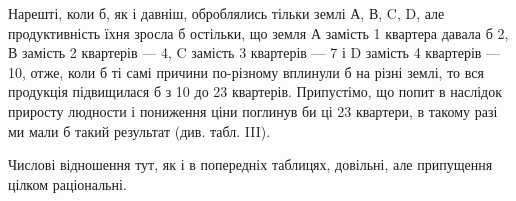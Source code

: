 Нарешті, коли б, як і давніш, оброблялись тільки землі А, В, C, D, але продуктивність їхня зросла б
остільки, що земля А замість 1 квартера давала б 2, В замість 2 квартерів — 4,
C замість 3 квартерів — 7 і D замість 4 квартерів — 10, отже, коли б ті самі
причини по-різному вплинули б на різні землі, то вся продукція підвищилася
б з 10 до 23 квартерів. Припустімо, що попит в наслідок приросту
людности і пониження ціни поглинув би ці 23 квартери, в такому разі ми
мали б такий результат (див. табл. III).

Числові відношення тут, як і в попередніх таблицях, довільні, але припущення
цілком раціональні.

